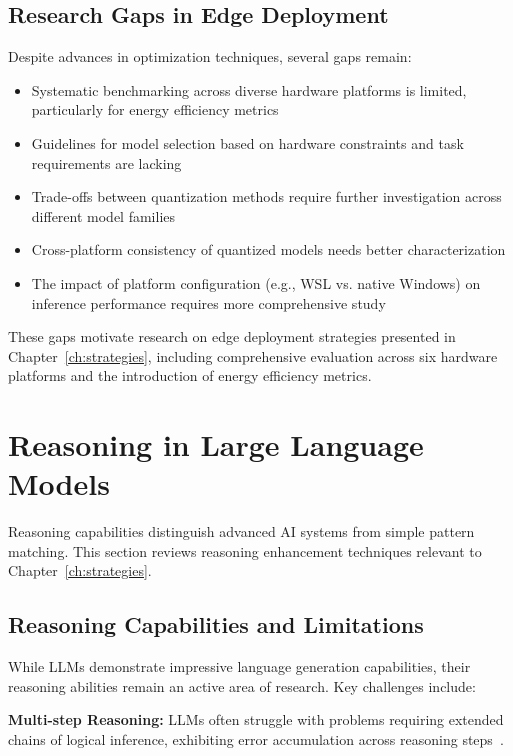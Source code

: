 \subsection{Research Gaps in Edge Deployment}

Despite advances in optimization techniques, several gaps remain:

\begin{itemize}[leftmargin=*]
    \item Systematic benchmarking across diverse hardware platforms is limited, particularly for energy efficiency metrics
    \item Guidelines for model selection based on hardware constraints and task requirements are lacking
    \item Trade-offs between quantization methods require further investigation across different model families
    \item Cross-platform consistency of quantized models needs better characterization
    \item The impact of platform configuration (e.g., WSL vs. native Windows) on inference performance requires more comprehensive study
\end{itemize}

These gaps motivate research on edge deployment strategies presented in Chapter~\ref{ch:strategies}, including comprehensive evaluation across six hardware platforms and the introduction of energy efficiency metrics.

\section{Reasoning in Large Language Models}
\label{sec:lit_reasoning}

Reasoning capabilities distinguish advanced AI systems from simple pattern matching. This section reviews reasoning enhancement techniques relevant to Chapter~\ref{ch:strategies}.

\subsection{Reasoning Capabilities and Limitations}

While LLMs demonstrate impressive language generation capabilities, their reasoning abilities remain an active area of research. Key challenges include:

\textbf{Multi-step Reasoning:} LLMs often struggle with problems requiring extended chains of logical inference, exhibiting error accumulation across reasoning steps~\cite{huang2023reasoning,tong2024llm_mistakes}.

